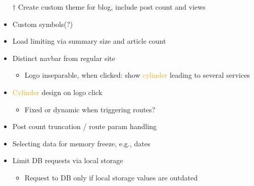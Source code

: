 \documentclass{article}
\begin{document}
{\begin{itemize}[label=\textsection]
\begin{itemize}[label=$\multimapdotinv$, leftmargin=3mm]
          \begin{itemize}[label=\wr, leftmargin=1.7mm]
            \item May use to obscure articles and release on specific time
          \end{itemize}
        \item[$\dag$] Create custom theme for blog, include post count and views
        \item Custom symbols(?)
        \item Load limiting via summary size and article count
        \item Distinct navbar from regular site
          \begin{itemize}[label=\wr, leftmargin=1.7mm]
            \item Logo inseparable, when clicked: show \textcolor{orange}{cylinder} leading to several services
          \end{itemize}
      \end{itemize}
  \end{itemize}
}
{
  \raggedright
  \begin{itemize}[label=\blitzb]
    \small
    \item \textcolor{orange}{Cylinder} design on logo click\:
      \begin{itemize}[label=$\multimapinv$]
        \item Fixed or dynamic when triggering routes?
      \end{itemize}
      \normalsize
    \item Post count truncation / route param handling
    \item Selecting data for memory freeze, e.g., dates
    \item Limit DB requests via local storage
      \begin{itemize}[label=$\multimapinv$]
        \item Request to DB only if local storage values are outdated
      \end{itemize}
  \end{itemize}
}

\deploy
{

}
{

}

\report
{

}
\end{document}
